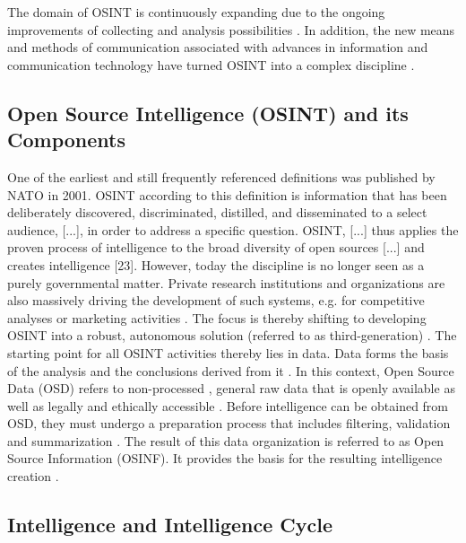 \documentclass[10pt]{article}
\begin{document}
The domain of OSINT is continuously expanding due to the ongoing improvements of
collecting and analysis possibilities \cite{AlKilani.2021, Ghioni.2023, Williams.2018}. In
addition, the new means and methods of communication associated with advances in information
and communication technology have turned OSINT into a complex discipline
\cite{AlKilani.2021, Benes.2013, Chen.2012, Williams.2018}.

\subsection{Open Source Intelligence (OSINT) and its Components}

One of the earliest and still frequently referenced definitions \cite{DosPassos.2017}
was published by NATO in 2001. OSINT according to this definition is information that has been
deliberately discovered, discriminated, distilled, and disseminated to a select audience,
[...], in order to address a specific question. OSINT, [...] thus applies the proven
process of intelligence to the broad diversity of open sources [...] and creates
intelligence [23]. However, today the discipline is no longer seen as a purely governmental
matter. Private research institutions and organizations \cite{Bohm.2021,Mercado.2005} are
also massively driving the development of such systems, e.g. for competitive analyses or marketing activities
\cite{AlKilani.2021, Dokman.2020,Ghioni.2023}. The focus is thereby shifting to
developing OSINT into a robust, autonomous solution (referred to as third-generation) \cite{Billings.1997,PastorGalindo.2019,Schaurer.2010}.
The starting point for all OSINT activities thereby lies in data. Data forms the basis of the
analysis and the conclusions derived from it \cite{Gibson.2016}. In this context, Open Source Data (OSD)
refers to non-processed \cite{DosPassos.2017}, general raw data that is openly available
\cite{Burke.2007} as well as legally and ethically accessible
\cite{Schaurer.2010, NorthAtlanticTreatyOrganization.2001}. Before intelligence can be obtained
from OSD, they must undergo a preparation process that includes filtering, validation and
summarization \cite{DosPassos.2017, NorthAtlanticTreatyOrganization.2001}. The result of this
data organization \cite{Schaurer.2010} is referred to as Open Source Information (OSINF). It provides the basis for the
resulting intelligence creation \cite{DosPassos.2017,Schaurer.2010}.

\subsection{Intelligence and Intelligence Cycle}
\end{document}
